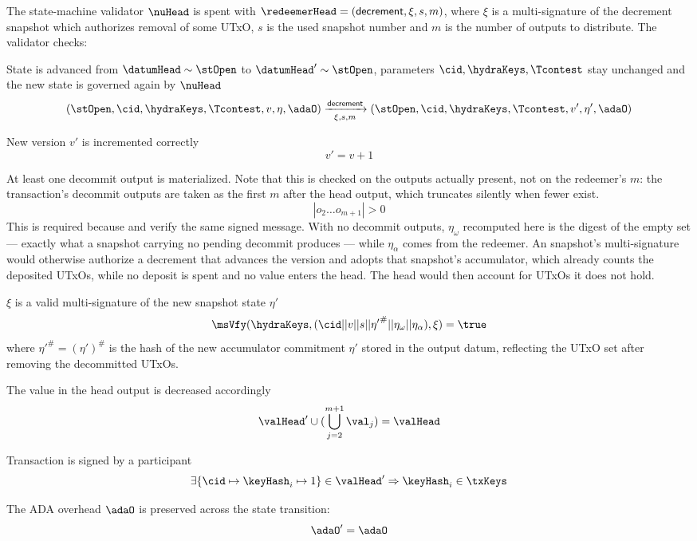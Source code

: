 \noindent The state-machine validator $\nuHead$ is spent with
$\redeemerHead = (\mathsf{decrement}, \xi, s, m)$, where $\xi$ is a multi-signature of
the decrement snapshot which authorizes removal of some UTxO, $s$ is the
used snapshot number and $m$ is the number of outputs to distribute. The
validator checks:
\begin{menumerate}
	\item State is advanced from $\datumHead \sim \stOpen$ to
	$\datumHead' \sim \stOpen$, parameters $\cid,\hydraKeys,\Tcontest$ stay
	unchanged and the new state is governed again by $\nuHead$
	\[
		(\stOpen,\cid,\hydraKeys,\Tcontest,v,\eta,\adaO) \xrightarrow[\xi, s, m]{\mathsf{decrement}} (\stOpen,\cid,\hydraKeys,\Tcontest,v',\eta',\adaO)
	\]
	\item New version $v'$ is incremented correctly
	\[
		v' = v + 1
	\]
	\item At least one decommit output is materialized. Note that this is checked on
	the outputs actually present, not on the redeemer's $m$: the transaction's
	decommit outputs are taken as the first $m$ after the head output, which
	truncates silently when fewer exist.
	\[
		|o_{2} \dots o_{m+1}| > 0
	\]
	This is required because \mtxIncrement{} and \mtxDecrement{} verify the same
	signed message. With no decommit outputs, $\eta_{\omega}$ recomputed here is the
	digest of the empty set — exactly what a snapshot carrying no pending decommit
	produces — while $\eta_{\alpha}$ comes from the redeemer. An
	\mtxIncrement{} snapshot's multi-signature would otherwise authorize a decrement
	that advances the version and adopts that snapshot's accumulator, which already
	counts the deposited UTxOs, while no deposit is spent and no value enters the
	head. The head would then account for UTxOs it does not hold.
	\item $\xi$ is a valid multi-signature of the new snapshot state $\eta'$
	\[
		\msVfy(\hydraKeys,(\cid || v || s || {\eta'}^{\#} || \eta_{\omega} || \eta_{\alpha}),\xi) = \true
	\]
	where ${\eta'}^{\#} = (\eta')^{\#}$ is the hash of the new accumulator commitment $\eta'$
	stored in the output datum, reflecting the UTxO set after removing the decommitted UTxOs.
	\item The value in the head output is decreased accordingly
	\[
		\valHead' \cup (\bigcup_{j=2}^{m+1} \val_{j}) = \valHead
	\]
	\item Transaction is signed by a participant
	\[
		\exists \{\cid \mapsto \keyHash_{i} \mapsto 1\} \in \valHead' \Rightarrow \keyHash_{i} \in \txKeys
	\]
	\item The ADA overhead $\adaO$ is preserved across the state transition:
	\[
		\adaO' = \adaO
	\]
\end{menumerate}

